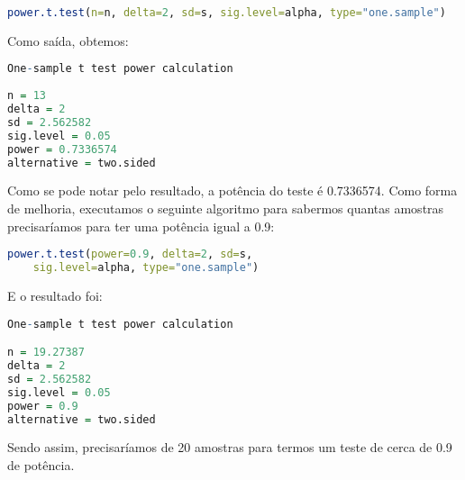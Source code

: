 \documentclass[12pt, a4paper]{article}
\begin{document}
\begin{lstlisting}[language=R]
power.t.test(n=n, delta=2, sd=s, sig.level=alpha, type="one.sample")
\end{lstlisting}

Como saída, obtemos:

\begin{lstlisting}[language=R]
One-sample t test power calculation 
     
n = 13
delta = 2
sd = 2.562582
sig.level = 0.05
power = 0.7336574
alternative = two.sided
\end{lstlisting}

\par Como se pode notar pelo resultado, a potência do teste é 0.7336574. Como forma de melhoria, executamos o seguinte algoritmo para sabermos quantas amostras precisaríamos para ter uma potência igual a 0.9:

\begin{lstlisting}[language=R]
power.t.test(power=0.9, delta=2, sd=s,
	sig.level=alpha, type="one.sample")
\end{lstlisting}

E o resultado foi:

\begin{lstlisting}[language=R]
One-sample t test power calculation 

n = 19.27387
delta = 2
sd = 2.562582
sig.level = 0.05
power = 0.9
alternative = two.sided
\end{lstlisting}

\par Sendo assim, precisaríamos de 20 amostras para termos um teste de cerca de 0.9 de potência.

\begin{thebibliography}{5}
\end{thebibliography}		
		
\end{document}
